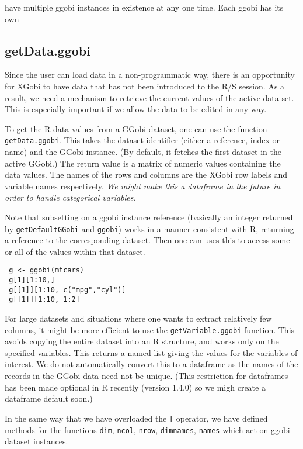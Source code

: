 \documentclass{article}
\def\SFunction#1{{\texttt{\red #1}}}
\def\note#1{\textsl{\red #1}}
\begin{document}
have multiple ggobi
instances in existence at any one time.
Each ggobi has its own


\subsection{getData.ggobi}
Since the user can load data in a non-programmatic way, there is an
opportunity for XGobi to have data that has not been introduced to the
R/S session.  As a result, we need a mechanism to retrieve the current
values of the active data set.  This is especially important if we
allow the data to be edited in any way.

To get the R data values from a GGobi dataset, one can use the
function \SFunction{getData.ggobi}.  This takes the dataset identifier
(either a reference, index or name) and the GGobi instance.  (By
default, it fetches the first dataset in the active GGobi.)  The
return value is a matrix of numeric values containing the data values.
The names of the rows and columns are the XGobi row labels and
variable names respectively.  \note{We might make this a dataframe in
  the future in order to handle categorical variables.}

Note that subsetting on a ggobi instance reference (basically an
integer returned by \SFunction{getDefaultGGobi} and \SFunction{ggobi})
works in a manner consistent with R, returning a reference
to the corresponding dataset.
Then one can uses this to access
some or all of the values within that dataset.
\begin{verbatim}
 g <- ggobi(mtcars)
 g[1][1:10,]
 g[[1]][1:10, c("mpg","cyl")]
 g[[1]][1:10, 1:2]
\end{verbatim}

For large datasets and situations where one wants to extract
relatively few columns, it might be more efficient to use the
\SFunction{getVariable.ggobi} function.  This avoids copying the
entire dataset into an R structure, and works only on the specified
variables.  This returns a named list giving the values for the
variables of interest.  We do not automatically convert this to a
dataframe as the names of the records in the GGobi data need not be
unique.  (This restriction for dataframes has been made optional in R
recently (version 1.4.0) so we migh create a dataframe default soon.)

In the same way that we have overloaded the \SFunction{[} operator, we
  have defined methods for the functions \SFunction{dim},
  \SFunction{ncol}, \SFunction{nrow}, \SFunction{dimnames},
  \SFunction{names} which act on ggobi dataset instances.
\end{document}
